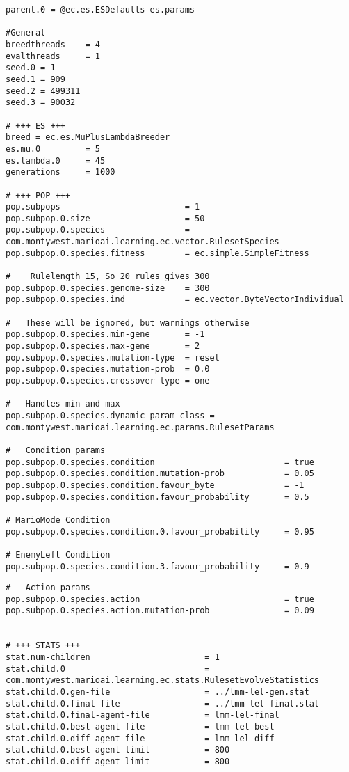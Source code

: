 \begin{appendices}
\begin{minipage}{0.9\linewidth}
\begin{lstlisting}
parent.0 = @ec.es.ESDefaults es.params

#General
breedthreads 	= 4
evalthreads 	= 1
seed.0 = 1
seed.1 = 909
seed.2 = 499311
seed.3 = 90032

# +++ ES +++
breed = ec.es.MuPlusLambdaBreeder
es.mu.0 		= 5
es.lambda.0 	= 45
generations 	= 1000

# +++ POP +++
pop.subpops 						= 1
pop.subpop.0.size 					= 50
pop.subpop.0.species 				= com.montywest.marioai.learning.ec.vector.RulesetSpecies
pop.subpop.0.species.fitness		= ec.simple.SimpleFitness

#	 Rulelength 15, So 20 rules gives 300
pop.subpop.0.species.genome-size 	= 300
pop.subpop.0.species.ind 			= ec.vector.ByteVectorIndividual

#	These will be ignored, but warnings otherwise 
pop.subpop.0.species.min-gene		= -1
pop.subpop.0.species.max-gene		= 2
pop.subpop.0.species.mutation-type	= reset
pop.subpop.0.species.mutation-prob  = 0.0
pop.subpop.0.species.crossover-type = one

#	Handles min and max
pop.subpop.0.species.dynamic-param-class = com.montywest.marioai.learning.ec.params.RulesetParams

#	Condition params
pop.subpop.0.species.condition							= true
pop.subpop.0.species.condition.mutation-prob 			= 0.05
pop.subpop.0.species.condition.favour_byte 				= -1
pop.subpop.0.species.condition.favour_probability 		= 0.5

# MarioMode Condition
pop.subpop.0.species.condition.0.favour_probability 	= 0.95

# EnemyLeft Condition
pop.subpop.0.species.condition.3.favour_probability 	= 0.9
\end{lstlisting}
\end{minipage}

\begin{minipage}{0.9\linewidth}
\begin{lstlisting}
#	Action params
pop.subpop.0.species.action								= true
pop.subpop.0.species.action.mutation-prob 				= 0.09


# +++ STATS +++
stat.num-children 						= 1
stat.child.0 							= com.montywest.marioai.learning.ec.stats.RulesetEvolveStatistics
stat.child.0.gen-file					= ../lmm-lel-gen.stat
stat.child.0.final-file 				= ../lmm-lel-final.stat
stat.child.0.final-agent-file			= lmm-lel-final
stat.child.0.best-agent-file			= lmm-lel-best
stat.child.0.diff-agent-file			= lmm-lel-diff
stat.child.0.best-agent-limit			= 800
stat.child.0.diff-agent-limit			= 800



\end{lstlisting}
\end{minipage}
\end{appendices}
